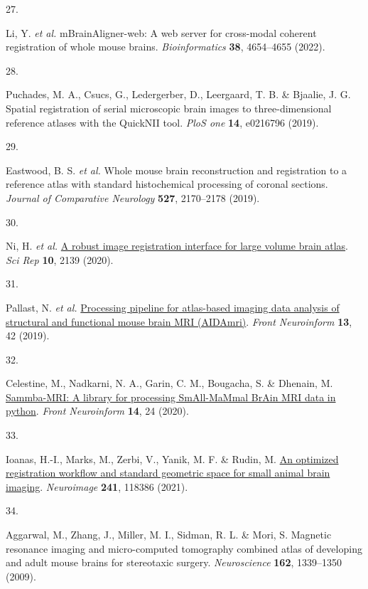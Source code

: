 \documentclass[
  12pt,
]{article}
\newlength{\cslhangindent}
\newlength{\csllabelwidth}
\newenvironment{CSLReferences}[2] %
 {\begin{list}{}{%
  \setlength{\itemindent}{0pt}
  \setlength{\leftmargin}{0pt}
  \setlength{\parsep}{0pt}
  \ifodd #1
   \setlength{\leftmargin}{\cslhangindent}
   \setlength{\itemindent}{-1\cslhangindent}
  \fi
  \setlength{\itemsep}{#2\baselineskip}}}
 {\end{list}}
\newcommand{\CSLLeftMargin}[1]{\parbox[t]{\csllabelwidth}{\strut#1\strut}}
\newcommand{\CSLRightInline}[1]{\parbox[t]{\linewidth - \csllabelwidth}{\strut#1\strut}}
\begin{document}
\begin{CSLReferences}{0}{0}
\CSLLeftMargin{27. }%
\CSLRightInline{Li, Y. \emph{et al.} mBrainAligner-web: A web server for
cross-modal coherent registration of whole mouse brains.
\emph{Bioinformatics} \textbf{38}, 4654--4655 (2022).}

\CSLLeftMargin{28. }%
\CSLRightInline{Puchades, M. A., Csucs, G., Ledergerber, D., Leergaard,
T. B. \& Bjaalie, J. G. Spatial registration of serial microscopic brain
images to three-dimensional reference atlases with the QuickNII tool.
\emph{PloS one} \textbf{14}, e0216796 (2019).}

\CSLLeftMargin{29. }%
\CSLRightInline{Eastwood, B. S. \emph{et al.} Whole mouse brain
reconstruction and registration to a reference atlas with standard
histochemical processing of coronal sections. \emph{Journal of
Comparative Neurology} \textbf{527}, 2170--2178 (2019).}

\CSLLeftMargin{30. }%
\CSLRightInline{Ni, H. \emph{et al.}
\href{https://doi.org/10.1038/s41598-020-59042-y}{A robust image
registration interface for large volume brain atlas}. \emph{Sci Rep}
\textbf{10}, 2139 (2020).}

\CSLLeftMargin{31. }%
\CSLRightInline{Pallast, N. \emph{et al.}
\href{https://doi.org/10.3389/fninf.2019.00042}{Processing pipeline for
atlas-based imaging data analysis of structural and functional mouse
brain MRI (AIDAmri)}. \emph{Front Neuroinform} \textbf{13}, 42 (2019).}

\CSLLeftMargin{32. }%
\CSLRightInline{Celestine, M., Nadkarni, N. A., Garin, C. M., Bougacha,
S. \& Dhenain, M.
\href{https://doi.org/10.3389/fninf.2020.00024}{Sammba-MRI: A library
for processing SmAll-MaMmal BrAin MRI data in python}. \emph{Front
Neuroinform} \textbf{14}, 24 (2020).}

\CSLLeftMargin{33. }%
\CSLRightInline{Ioanas, H.-I., Marks, M., Zerbi, V., Yanik, M. F. \&
Rudin, M. \href{https://doi.org/10.1016/j.neuroimage.2021.118386}{An
optimized registration workflow and standard geometric space for small
animal brain imaging}. \emph{Neuroimage} \textbf{241}, 118386 (2021).}

\CSLLeftMargin{34. }%
\CSLRightInline{Aggarwal, M., Zhang, J., Miller, M. I., Sidman, R. L. \&
Mori, S. Magnetic resonance imaging and micro-computed tomography
combined atlas of developing and adult mouse brains for stereotaxic
surgery. \emph{Neuroscience} \textbf{162}, 1339--1350 (2009).}


\end{CSLReferences}
\end{document}
